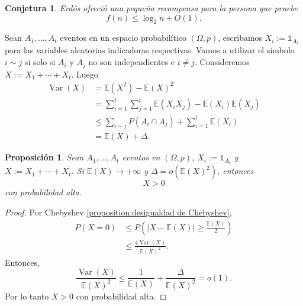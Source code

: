 \documentclass[12pt]{report}
\theoremstyle{plain}
\newtheorem{proposition}[theorem]{Proposición}
\newtheorem{conjecture}[theorem]{Conjetura}
\theoremstyle{definition}
\newcommand{\abs}[1]{\left \vert #1 \right \vert}
\begin{document}
\begin{conjecture}
Erdös ofreció una pequeña recompensa para la persona que pruebe
\[
    f(n) \leq \log_2 n + O(1).
\]
\end{conjecture}



\bigskip

Sean $A_1, \ldots, A_t$ eventos en un espacio probabilítico $(\Omega, p)$, escribamos $X_i := \mathbb{1}_{A_i}$ para las variables aleatorias indicadoras respectivas. Vamos a utilizar el símbolo $i \sim j$ si solo si $A_i$ y $A_j$ no son independientes e $i \neq j$. Consideremos $X := X_1 + \cdots + X_t$. Luego
\begin{align*}
\operatorname{Var} (X) &= \mathbb{E} (X^2) - \mathbb{E} (X)^2 \\
&= \sum_{i = 1}^t \sum_{j = 1}^t \mathbb{E}(X_i X_j) - \mathbb{E}(X_i) \mathbb{E}(X_j) \\
&\leq \sum_{i \sim j} P(A_i \cap A_j) + \sum_{i = 1}^t \mathbb{E} (X_i) \\
&= \mathbb{E} (X) + \Delta.
\end{align*}

\begin{proposition}
Sean $A_1, \ldots, A_t$ eventos en $(\Omega, p)$, $X_i := \mathbb{1}_{A_i}$ y $X:= X_1 + \cdots + X_t$. Si $\mathbb{E} (X) \longrightarrow + \infty$ y $\Delta = o (\mathbb{E}(X)^2)$, entonces
\[
    X > 0
\]
con probabilidad alta.
\end{proposition}
\begin{proof}
Por Chebyshev \ref{proposition:desigualdad de Chebyshev},
\begin{align*}
P(X = 0) &\leq P \left (\abs{X - \mathbb{E} (X)} \geq \frac{\mathbb{E} (X)}{2} \right ) \\
&\leq \frac{4 \operatorname{Var}(X)}{\mathbb{E}(X)^2} .
\end{align*}
Entonces,
\[
    \frac{\operatorname{Var}(X)}{\mathbb{E}(X)^2} \leq \frac{1}{\mathbb{E}(X)} + \frac{\Delta}{\mathbb{E}(X)^2} = o(1).
\]
Por lo tanto $X > 0$ con probabilidad alta.
\end{proof}
\end{document}
